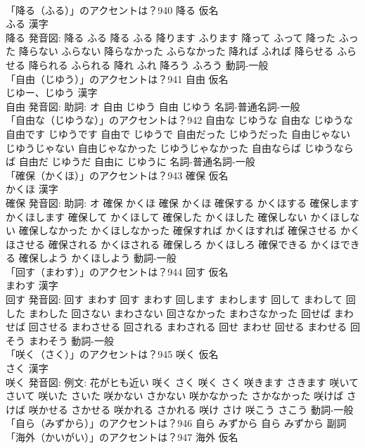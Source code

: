 \documentclass[8pt]{extreport}
\begin{document}
\begin{CJK}{UTF8}{min}
\\	「降る（ふる）」のアクセントは？940	降る 仮名　
\\	ふる 漢字　
\\	降る 発音図:	降る ふる		降る ふる 降ります ふります 降って ふって 降った ふった 降らない ふらない 降らなかった ふらなかった 降れば ふれば 降らせる ふらせる 降られる ふられる 降れ ふれ 降ろう ふろう				動詞-一般 
\\	「自由（じゆう）」のアクセントは？941	自由 仮名　
\\	じゆー、じゆう 漢字　
\\	自由 発音図: 助詞: オ	自由 じゆう		自由 じゆう				名詞-普通名詞-一般 
\\	「自由な（じゆうな）」のアクセントは？942		自由な じゆうな		自由な じゆうな 自由です じゆうです 自由で じゆうで 自由だった じゆうだった 自由じゃない じゆうじゃない 自由じゃなかった じゆうじゃなかった 自由ならば じゆうならば 自由だ じゆうだ 自由に じゆうに				名詞-普通名詞-一般 
\\	「確保（かくほ）」のアクセントは？943	確保 仮名　
\\	かくほ 漢字　
\\	確保 発音図: 助詞: オ	確保 かくほ		確保 かくほ 確保する かくほする 確保します かくほします 確保して かくほして 確保した かくほした 確保しない かくほしない 確保しなかった かくほしなかった 確保すれば かくほすれば 確保させる かくほさせる 確保される かくほされる 確保しろ かくほしろ 確保できる かくほできる 確保しよう かくほしよう				動詞-一般 
\\	「回す（まわす）」のアクセントは？944	回す 仮名　
\\	まわす 漢字　
\\	回す 発音図:	回す まわす		回す まわす 回します まわします 回して まわして 回した まわした 回さない まわさない 回さなかった まわさなかった 回せば まわせば 回させる まわさせる 回される まわされる 回せ まわせ 回せる まわせる 回そう まわそう				動詞-一般 
\\	「咲く（さく）」のアクセントは？945	咲く 仮名　
\\	さく 漢字　
\\	咲く 発音図: 例文: 花がヒも近い	咲く さく		咲く さく 咲きます さきます 咲いて さいて 咲いた さいた 咲かない さかない 咲かなかった さかなかった 咲けば さけば 咲かせる さかせる 咲かれる さかれる 咲け さけ 咲こう さこう				動詞-一般 
\\	「自ら（みずから）」のアクセントは？946		自ら みずから		自ら みずから				副詞 
\\	「海外（かいがい）」のアクセントは？947	海外 仮名　

\end{CJK}
\end{document}
